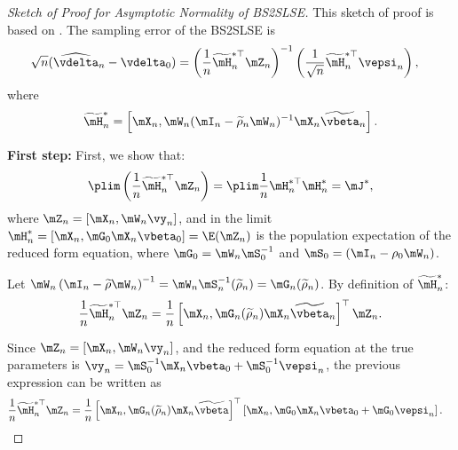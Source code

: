 \begin{proof}[Sketch of Proof for Asymptotic Normality of BS2SLSE]
This sketch of proof is based on \cite{lee2003best}. The sampling error of the BS2SLSE is
\begin{equation}\label{eq:asy_2sls_pr2}
\begin{aligned}
\sqrt{n}(\widehat{\vdelta}_{n} - \vdelta_0) & = \left(\frac{1}{n}\widetilde{\mH}^{*\top}_n \mZ_n\right)^{-1}\left(\frac{1}{\sqrt{n}}\widetilde{\mH}^{*\top}_n\vepsi_n\right),
\end{aligned}
\end{equation}
%
where 
\begin{equation*}
\widetilde{\mH}^{*}_n =\left[\mX_n, \mW_n(\mI_n - \widetilde{\rho}_n\mW_n)^{-1}\mX_n\widetilde{\vbeta}_n\right].
\end{equation*}

\textbf{First step:} First, we show that:
\begin{equation*}
\plim \left(\frac{1}{n}\widetilde{\mH}^{*\top}_n \mZ_n\right)=\plim \frac{1}{n}\mH^{*\top}_n\mH_n^* = \mJ^*, 
\end{equation*}
%
where $\mZ_n = \left[\mX_n, \mW_n\vy_n\right]$, and in the limit $\mH^{*}_n = \left[\mX_n, \mG_0 \mX_n\vbeta_0\right] = \E(\mZ_n)$ is the population expectation of the reduced form equation, where $\mG_0 = \mW_n\mS_0^{-1}$ and $\mS_0 = \left(\mI_n - \rho_0\mW_n\right)$.

Let $\mW_n\left(\mI_n - \widetilde{\rho}\mW_n\right)^{-1} = \mW_n\mS_n^{-1}(\widetilde{\rho}_n) = \mG_n(\widetilde{\rho}_n)$. By definition of $\widetilde{\mH}^{*}_n$:
\begin{equation*}
  \frac{1}{n}\widetilde{\mH}^{*\top}_n \mZ_n = \frac{1}{n}\left[\mX_n, \mG_n(\widetilde{\rho}_n)\mX_n\widetilde{\vbeta}_n\right]^\top\mZ_n. 
\end{equation*}

Since $\mZ_n = \left[\mX_n, \mW_n\vy_n\right]$, and the reduced form equation at the true parameters is $\vy_n = \mS_0^{-1}\mX_n\vbeta_0 + \mS_0^{-1}\vepsi_n$, the previous expression can be written as
\begin{equation*}
\begin{aligned}
\frac{1}{n}\widetilde{\mH}^{*\top}_n \mZ_n & = \frac{1}{n}\left[\mX_n, \mG_n(\widetilde{\rho}_n)\mX_n\widetilde{\vbeta}\right]^\top\left[\mX_n, \mG_0\mX_n\vbeta_0 + \mG_0\vepsi_n\right].
\end{aligned}
\end{equation*}


\end{proof}
